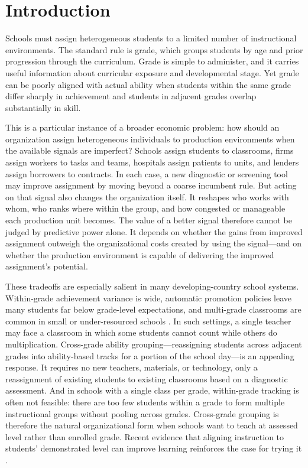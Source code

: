 \documentclass[11pt]{article}
\begin{document}
\section{Introduction}
\label{sec:intro}

Schools must assign heterogeneous students to a limited number of instructional environments. The standard rule is grade, which groups students by age and prior progression through the curriculum. Grade is simple to administer, and it carries useful information about curricular exposure and developmental stage. Yet grade can be poorly aligned with actual ability when students within the same grade differ sharply in achievement and students in adjacent grades overlap substantially in skill.

This is a particular instance of a broader economic problem: how should an organization assign heterogeneous individuals to production environments when the available signals are imperfect? Schools assign students to classrooms, firms assign workers to tasks and teams, hospitals assign patients to units, and lenders assign borrowers to contracts. In each case, a new diagnostic or screening tool may improve assignment by moving beyond a coarse incumbent rule. But acting on that signal also changes the organization itself. It reshapes who works with whom, who ranks where within the group, and how congested or manageable each production unit becomes. The value of a better signal therefore cannot be judged by predictive power alone. It depends on whether the gains from improved assignment outweigh the organizational costs created by using the signal---and on whether the production environment is capable of delivering the improved assignment's potential.

These tradeoffs are especially salient in many developing-country school systems. Within-grade achievement variance is wide, automatic promotion policies leave many students far below grade-level expectations, and multi-grade classrooms are common in small or under-resourced schools \citep{banerjee/cole/duflo/linden:2007,muralidharan2019disrupting}. In such settings, a single teacher may face a classroom in which some students cannot count while others do multiplication. Cross-grade ability grouping---reassigning students across adjacent grades into ability-based tracks for a portion of the school day---is an appealing response. It requires no new teachers, materials, or technology, only a reassignment of existing students to existing classrooms based on a diagnostic assessment. And in schools with a single class per grade, within-grade tracking is often not feasible: there are too few students within a grade to form multiple instructional groups without pooling across grades. Cross-grade grouping is therefore the natural organizational form when schools want to teach at assessed level rather than enrolled grade. Recent evidence that aligning instruction to students' demonstrated level can improve learning reinforces the case for trying it \citep{duflo2020experimental, duflo2011peer}.
\end{document}
